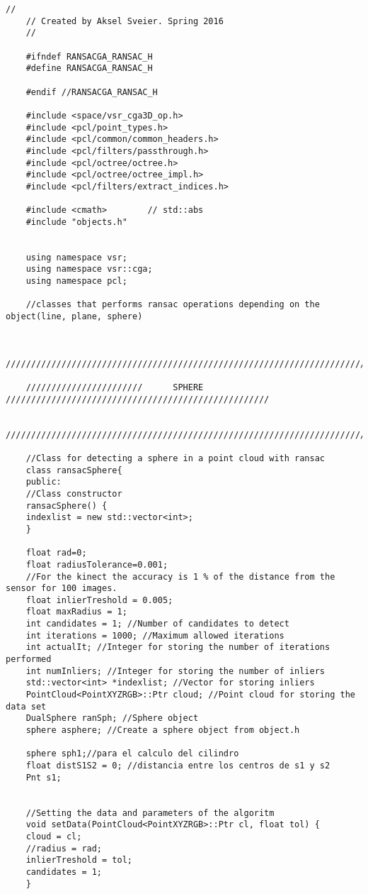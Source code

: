 {\fontsize{7.5}{10} \selectfont
	\label{code:ransac}
	\begin{lstlisting}[caption={Archivo ransac.h}]
	//
	// Created by Aksel Sveier. Spring 2016
	//
	
	#ifndef RANSACGA_RANSAC_H
	#define RANSACGA_RANSAC_H
	
	#endif //RANSACGA_RANSAC_H
	
	#include <space/vsr_cga3D_op.h>
	#include <pcl/point_types.h>
	#include <pcl/common/common_headers.h>
	#include <pcl/filters/passthrough.h>
	#include <pcl/octree/octree.h>
	#include <pcl/octree/octree_impl.h>
	#include <pcl/filters/extract_indices.h>
	
	#include <cmath>        // std::abs
	#include "objects.h"
	
	
	using namespace vsr;
	using namespace vsr::cga;
	using namespace pcl;
	
	//classes that performs ransac operations depending on the object(line, plane, sphere)
	
	
	///////////////////////////////////////////////////////////////////////////////////////////
	
	///////////////////////      SPHERE    ////////////////////////////////////////////////////
	
	///////////////////////////////////////////////////////////////////////////////////////////
	
	//Class for detecting a sphere in a point cloud with ransac
	class ransacSphere{
	public:
	//Class constructor
	ransacSphere() {
	indexlist = new std::vector<int>;
	}
	
	float rad=0;
	float radiusTolerance=0.001;
	//For the kinect the accuracy is 1 % of the distance from the sensor for 100 images.
	float inlierTreshold = 0.005; 
	float maxRadius = 1;
	int candidates = 1; //Number of candidates to detect
	int iterations = 1000; //Maximum allowed iterations
	int actualIt; //Integer for storing the number of iterations performed
	int numInliers; //Integer for storing the number of inliers
	std::vector<int> *indexlist; //Vector for storing inliers
	PointCloud<PointXYZRGB>::Ptr cloud; //Point cloud for storing the data set
	DualSphere ranSph; //Sphere object
	sphere asphere; //Create a sphere object from object.h
	
	sphere sph1;//para el calculo del cilindro
	float distS1S2 = 0; //distancia entre los centros de s1 y s2
	Pnt s1;
	
	
	//Setting the data and parameters of the algoritm
	void setData(PointCloud<PointXYZRGB>::Ptr cl, float tol) {
	cloud = cl;
	//radius = rad;
	inlierTreshold = tol;
	candidates = 1;
	}
	

\end{lstlisting}}
